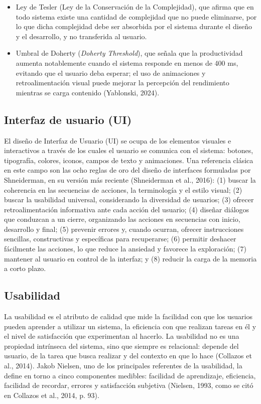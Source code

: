 \begin{itemize}
    \item Ley de Tesler (Ley de la Conservación de la Complejidad), que afirma que en todo sistema existe una cantidad de complejidad que no puede eliminarse, por lo que dicha complejidad debe ser absorbida por el sistema durante el diseño y el desarrollo, y no transferida al usuario.
    \item Umbral de Doherty (\textit{Doherty Threshold}), que señala que la productividad aumenta notablemente cuando el sistema responde en menos de 400 ms, evitando que el usuario deba esperar; el uso de animaciones y retroalimentación visual puede mejorar la percepción del rendimiento mientras se carga contenido (Yablonski, 2024).
\end{itemize}

\subsection{Interfaz de usuario (UI)}
El diseño de Interfaz de Usuario (UI) se ocupa de los elementos visuales e interactivos a través de los cuales el usuario se comunica con el sistema: botones, tipografía, colores, iconos, campos de texto y animaciones. Una referencia clásica en este campo son las ocho reglas de oro del diseño de interfaces formuladas por Shneiderman, en su versión más reciente (Shneiderman et al., 2016): (1) buscar la coherencia en las secuencias de acciones, la terminología y el estilo visual; (2) buscar la usabilidad universal, considerando la diversidad de usuarios; (3) ofrecer retroalimentación informativa ante cada acción del usuario; (4) diseñar diálogos que conduzcan a un cierre, organizando las acciones en secuencias con inicio, desarrollo y final; (5) prevenir errores y, cuando ocurran, ofrecer instrucciones sencillas, constructivas y específicas para recuperarse; (6) permitir deshacer fácilmente las acciones, lo que reduce la ansiedad y favorece la exploración; (7) mantener al usuario en control de la interfaz; y (8) reducir la carga de la memoria a corto plazo.

\subsection{Usabilidad}
La usabilidad es el atributo de calidad que mide la facilidad con que los usuarios pueden aprender a utilizar un sistema, la eficiencia con que realizan tareas en él y el nivel de satisfacción que experimentan al hacerlo. La usabilidad no es una propiedad intrínseca del sistema, sino que siempre es relacional: depende del usuario, de la tarea que busca realizar y del contexto en que lo hace (Collazos et al., 2014).
Jakob Nielsen, uno de los principales referentes de la usabilidad, la define en torno a cinco componentes medibles: facilidad de aprendizaje, eficiencia, facilidad de recordar, errores y satisfacción subjetiva (Nielsen, 1993, como se citó en Collazos et al., 2014, p. 93).


